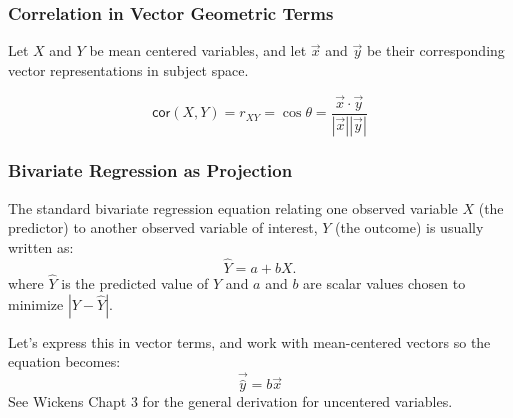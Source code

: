 \documentclass{beamer}
\begin{document}
\begin{frame}
  \frametitle{Correlation in Vector Geometric Terms}

Let $X$ and $Y$ be mean centered variables, and let $\vec{x}$ and $\vec{y}$ be their corresponding vector representations in subject space.

\begin{center}

\end{center}

\[
\mathsf{cor}(X,Y) = r_{XY} = \cos \theta = \frac{\vec{x} \cdot \vec{y}}{|\vec{x}||\vec{y}|}
\]


\end{frame}


\begin{frame}
  \frametitle{Bivariate Regression as Projection}

The standard bivariate regression equation relating one observed variable $X$ (the predictor) to another observed variable of interest, $Y$ (the outcome) is usually written as:
\[
\widehat{Y} = a + bX.
\]
where $\widehat{Y}$ is the predicted value of $Y$ and $a$ and $b$ are scalar values chosen to minimize $|Y-\widehat{Y}|$.

\medskip

Let's express this in vector terms, and work with mean-centered vectors so the equation becomes:
\[
\vec{\widehat{y}} = b\vec{x}
\]
See Wickens Chapt 3 for the general derivation for uncentered variables.

\end{frame}
\end{document}
